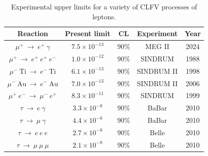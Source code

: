 \documentclass{beamer}
\begin{document}
   


\begin{frame}
    \begin{center}  
        \begin{table}[!h]
        \centering
        \renewcommand{\arraystretch}{1}
        \begin{tabular}{c c c c c}
        \hline
        Reaction & Present limit & CL & Experiment &  Year \\
        \hline
        $\mu^+\ \rightarrow \ e^+ \ \gamma$& $7.5 \times 10^{-13}$ & 90\% & MEG II & 2024 \\
        $\mu^+ \ \rightarrow \ e^+ \ e^+ \ e^-$ & $1.0 \times 10^{-12}$ & 90\% & SINDRUM & 1988 \\
        $\mu^- \ \text{Ti}\ \rightarrow \ e^- \ \text{Ti}$ &  $6.1 \times 10^{-13}$ & 90\% & SINDRUM II & 1998\\
        $\mu^- \ \text{Au}\ \rightarrow \ e^- \ \text{Au}$ & $7.0 \times 10^{-13}$ & 90\% & SINDRUM II & 2006  \\
        $\mu^+ \ e^- \ \rightarrow \ \mu^- \ e^+$ & $8.3 \times 10^{-11}$ & 90\% & SINDRUM & 1999 \\
        $\tau \ \rightarrow \ e \ \gamma$ & $3.3 \times 10^{-8}$ & 90\% & BaBar & 2010 \\
        $\tau \ \rightarrow \ \mu \ \gamma$ & $4.4 \times 10^{-8}$ & 90\% & BaBar & 2010 \\
        $\tau \ \rightarrow \ e \ e \  e$ & $2.7 \times 10^{-8}$ & 90\% & Belle & 2010 \\
        $\tau \ \rightarrow \ \mu \ \mu  \ \mu$ & $2.1 \times 10^{-8}$ & 90\% & Belle & 2010  \\
        \hline
        \end{tabular}
        \caption{Experimental upper limits for a variety of CLFV processes of leptons.}
        \label{tab:upperlimits}
        \end{table}
    \end{center}
    \end{frame}
\end{document}
